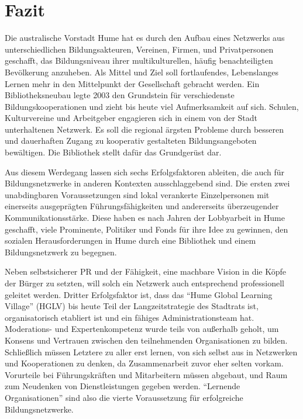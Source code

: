 \documentclass[a4paper,
fontsize=11pt,
oneside,
numbers=noperiodatend,
parskip=half-,
bibliography=totoc,
final
]{scrartcl}
\begin{document}
\hypertarget{fazit}{%
\section*{Fazit}\label{fazit}}

Die australische Vorstadt Hume hat es durch den Aufbau eines Netzwerks
aus unterschiedlichen Bildungsakteuren, Vereinen, Firmen, und
Privatpersonen geschafft, das Bildungsniveau ihrer multikulturellen,
häufig benachteiligten Bevölkerung anzuheben. Als Mittel und Ziel soll
fortlaufendes, Lebenslanges Lernen mehr in den Mittelpunkt der
Gesellschaft gebracht werden. Ein Bibliotheksneubau legte 2003 den
Grundstein für verschiedenste Bildungskooperationen und zieht bis heute
viel Aufmerksamkeit auf sich. Schulen, Kulturvereine und Arbeitgeber
engagieren sich in einem von der Stadt unterhaltenen Netzwerk. Es soll
die regional ärgsten Probleme durch besseren und dauerhaften Zugang zu
kooperativ gestalteten Bildungsangeboten bewältigen. Die Bibliothek
stellt dafür das Grundgerüst dar.

Aus diesem Werdegang lassen sich sechs Erfolgsfaktoren ableiten, die
auch für Bildungsnetzwerke in anderen Kontexten ausschlaggebend sind.
Die ersten zwei unabdingbaren Voraussetzungen sind lokal verankerte
Einzelpersonen mit einerseits ausgeprägten Führungsfähigkeiten und
andererseits überzeugender Kommunikationsstärke. Diese haben es nach
Jahren der Lobbyarbeit in Hume geschafft, viele Prominente, Politiker
und Fonds für ihre Idee zu gewinnen, den sozialen Herausforderungen in
Hume durch eine Bibliothek und einem Bildungsnetzwerk zu begegnen.

Neben selbstsicherer PR und der Fähigkeit, eine machbare Vision in die
Köpfe der Bürger zu setzten, will solch ein Netzwerk auch entsprechend
professionell geleitet werden. Dritter Erfolgsfaktor ist, dass das
\enquote{Hume Global Learning Village} (HGLV) bis heute Teil der
Langzeitstrategie des Stadtrats ist, organisatorisch etabliert ist und
ein fähiges Administrationsteam hat. Moderations- und Expertenkompetenz
wurde teils von außerhalb geholt, um Konsens und Vertrauen zwischen den
teilnehmenden Organisationen zu bilden. Schließlich müssen Letztere zu
aller erst lernen, von sich selbst aus in Netzwerken und Kooperationen
zu denken, da Zusammenarbeit zuvor eher selten vorkam. Vorurteile bei
Führungskräften und Mitarbeitern müssen abgebaut, und Raum zum Neudenken
von Dienstleistungen gegeben werden. \enquote{Lernende Organisationen}
sind also die vierte Voraussetzung für erfolgreiche Bildungsnetzwerke.
\end{document}
